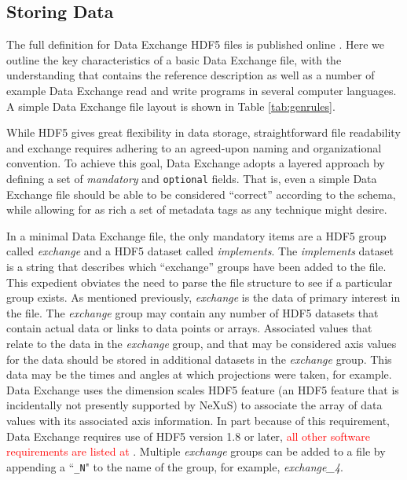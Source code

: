 \documentclass[pdf]{iucr}              %
\begin{document}
\subsection{Storing Data}

The full definition for Data Exchange HDF5 files is published online \cite{data_exchange}. Here we outline the key characteristics of a basic Data Exchange file, with the understanding that \cite{data_exchange} contains the reference description as well as a number of example Data Exchange read and write programs in several computer languages. A simple Data Exchange file layout is shown in Table \ref{tab:genrules}.

While HDF5 gives great flexibility in data storage, straightforward file readability and exchange requires adhering to an agreed-upon naming and organizational convention. To achieve this goal, Data Exchange adopts a layered approach by defining a set of \emph{mandatory} and \texttt{optional} fields. That is, even a simple Data Exchange file should be able to be considered ``correct'' according to the schema, while allowing for as rich a set of metadata tags as any technique might desire.  

In a minimal Data Exchange file, the only mandatory items are a HDF5 group called \emph{exchange} and a HDF5 dataset called \emph{implements}. The \emph{implements} dataset is a string that describes which ``exchange'' groups have been added to the file. This expedient obviates the need to parse the file structure to see if a particular group exists. As mentioned previously, \emph{exchange} is the data of primary interest in the file.  The \emph{exchange} group may contain any number of HDF5 datasets that contain actual data or links to data points or arrays. Associated values that relate to the data in the \emph{exchange} group, and that may be considered axis values for the data should be stored in additional datasets in the \emph{exchange} group. This data may be the times and angles at which projections were taken, for example. Data Exchange uses the dimension scales HDF5 feature (an HDF5 feature that is incidentally not presently supported by NeXuS) to associate the array of data values with its associated axis information. In part because of this requirement, Data Exchange requires use of HDF5 version 1.8 or later, \textcolor{red}{all other software requirements are listed at \cite{data_exchange}}. Multiple \emph{exchange} groups can be added to a file by appending a ``\texttt{\_N}" to the name of the group, for example, \emph{exchange\_4}.
\end{document}
